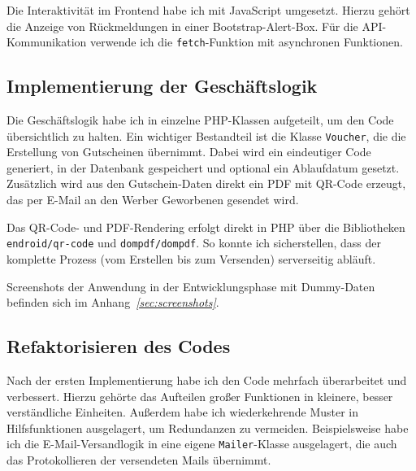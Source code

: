 

Die Interaktivität im Frontend habe ich mit JavaScript umgesetzt.
Hierzu gehört \zB die Anzeige von Rückmeldungen in einer Bootstrap-Alert-Box.
Für die API-Kommunikation verwende ich die \texttt{fetch}-Funktion mit asynchronen Funktionen.



\cleardoublepage

\subsection{Implementierung der Geschäftslogik}
\label{sec:ImplementierungGeschaeftslogik}

Die Geschäftslogik habe ich in einzelne PHP-Klassen aufgeteilt, um den Code übersichtlich zu halten.
Ein wichtiger Bestandteil ist die Klasse \texttt{Voucher}, die die Erstellung von Gutscheinen übernimmt.
Dabei wird ein eindeutiger Code generiert, in der Datenbank gespeichert und optional ein Ablaufdatum gesetzt.
Zusätzlich wird aus den Gutschein-Daten direkt ein PDF mit QR-Code erzeugt, das per E-Mail an den Werber \bzw Geworbenen gesendet wird.



Das QR-Code- und PDF-Rendering erfolgt direkt in PHP über die Bibliotheken \texttt{endroid/qr-code} und \texttt{dompdf/dompdf}.
So konnte ich sicherstellen, dass der komplette Prozess (vom Erstellen bis zum Versenden) serverseitig abläuft.

Screenshots der Anwendung in der Entwicklungsphase mit Dummy-Daten befinden sich im Anhang~\textit{\ref{sec:screenshots}}.

\subsection{Refaktorisieren des Codes}
\label{sec:RefaktorisierenDesCodes}
Nach der ersten Implementierung habe ich den Code mehrfach überarbeitet und verbessert.
Hierzu gehörte das Aufteilen großer Funktionen in kleinere, besser verständliche Einheiten.
Außerdem habe ich wiederkehrende Muster in Hilfsfunktionen ausgelagert, um Redundanzen zu vermeiden.
Beispielsweise habe ich die E-Mail-Versandlogik in eine eigene \texttt{Mailer}-Klasse ausgelagert, die auch das Protokollieren der versendeten Mails übernimmt.